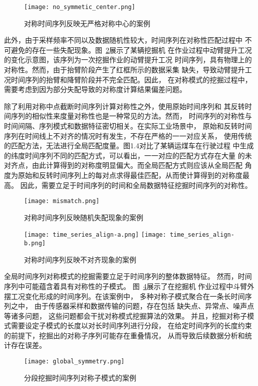 \begin{figure}
  \centering
  \texttt{[image: no\_symmetic\_center.png]}
  \caption{对称时间序列反映无严格对称中心的案例}
  \label{fig:no_symmetic_center}
\end{figure}

此外，由于采样频率不同以及数据随机性较大，时间序列在对称性匹配过程中
不可避免的存在一些失配现象。图~\ref{fig:mismatch}展示了某辆挖掘机
在作业过程中动臂提升工况的变化示意图，该序列为一次挖掘作业的动臂提升工况
时间序列，具有物理上的对称性。然而，由于抬臂阶段产生了红框所示的数据采集
缺失，导致动臂提升工况时间序列的抬臂和降臂阶段并不完全匹配。因此，
在对称模式的挖掘过程中，需要考虑到因为部分失配导致的对称度计算结果偏差问题。

除了利用对称中点截断时间序列计算对称性之外，使用原始时间序列和
其反转时间序列的相似性来度量对称性也是一种常见的方法。然而，
时间序列的对称性与时间间隔、序列模式和数据特征密切相关。在实际工业场景中，
原始和反转时间序列在时间线上不对齐的情况时有发生，不存在严格的一一对应关系，
使用传统的匹配方法，无法进行全局匹配度量。图1.4对比了某辆运煤车在行驶过程
中生成的纬度时间序列不同的匹配方式，可以看出，一一对应的匹配方式存在大量
的未对齐点，由此计算得到的对称度明显偏大。而全局匹配方式则应该从全局匹配
角度为原始和反转时间序列上的每对点求得最佳匹配，从而使计算得到的对称度最高。
因此，需要立足于时间序列的时间和全局数据特征挖掘时间序列的对称性。
\begin{figure}
  \centering
  \texttt{[image: mismatch.png]}
  \caption{对称时间序列反映随机失配现象的案例}
  \label{fig:mismatch}
\end{figure}
\begin{figure}
  \centering
    {\texttt{[image: time\_series\_align-a.png]}}
    {\texttt{[image: time\_series\_align-b.png]}}
  \caption{对称时间序列反映不对齐现象的案例}
  \label{fig:time_series_align}
\end{figure}

全局时间序列对称模式的挖掘需要立足于时间序列的整体数据特征。
然而，时间序列中可能蕴含着具有对称性的子模式。
图~\ref{fig:segement_symmetric_pattern}展示了在挖掘机
作业过程中斗臂外摆工况变化形成的时间序列。在该案例中，
多种对称子模式聚合在一条长时间序列之中，
由于传感器采样和数据传输的问题，存在包括
缺失点、异常点、噪声点等诸多问题，
这些问题都会干扰对称模式挖掘算法的效果。
并且，挖掘对称子模式需要设定子模式的长度以对长时间序列进行分段，
在给定时间序列的长度约束的前提下，挖掘出的对称子序列可能存在重叠情况，
从而导致后续数据分析和统计存在误差。
\begin{figure}
  \centering
  \texttt{[image: global\_symmetry.png]}
  \caption{分段挖掘时间序列对称子模式的案例}
  \label{fig:segement_symmetric_pattern}
\end{figure}

